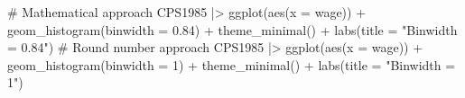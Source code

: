 \documentclass[
  letterpaper,
]{book}
\newenvironment{Shaded}{\begin{snugshade}}{\end{snugshade}}
\newcommand{\AttributeTok}[1]{\textcolor[rgb]{0.40,0.45,0.13}{#1}}
\newcommand{\CommentTok}[1]{\textcolor[rgb]{0.37,0.37,0.37}{#1}}
\newcommand{\DecValTok}[1]{\textcolor[rgb]{0.68,0.00,0.00}{#1}}
\newcommand{\FloatTok}[1]{\textcolor[rgb]{0.68,0.00,0.00}{#1}}
\newcommand{\FunctionTok}[1]{\textcolor[rgb]{0.28,0.35,0.67}{#1}}
\newcommand{\NormalTok}[1]{\textcolor[rgb]{0.00,0.23,0.31}{#1}}
\newcommand{\SpecialCharTok}[1]{\textcolor[rgb]{0.37,0.37,0.37}{#1}}
\newcommand{\StringTok}[1]{\textcolor[rgb]{0.13,0.47,0.30}{#1}}
\begin{document}
\begin{Shaded}
\begin{Highlighting}[]
\CommentTok{\# Mathematical approach}
\NormalTok{CPS1985 }\SpecialCharTok{|\textgreater{}} \FunctionTok{ggplot}\NormalTok{(}\FunctionTok{aes}\NormalTok{(}\AttributeTok{x =}\NormalTok{ wage)) }\SpecialCharTok{+}
    \FunctionTok{geom\_histogram}\NormalTok{(}\AttributeTok{binwidth =} \FloatTok{0.84}\NormalTok{) }\SpecialCharTok{+}
    \FunctionTok{theme\_minimal}\NormalTok{() }\SpecialCharTok{+}
    \FunctionTok{labs}\NormalTok{(}\AttributeTok{title =} \StringTok{"Binwidth = 0.84"}\NormalTok{)}
\CommentTok{\# Round number approach  }
\NormalTok{CPS1985 }\SpecialCharTok{|\textgreater{}} \FunctionTok{ggplot}\NormalTok{(}\FunctionTok{aes}\NormalTok{(}\AttributeTok{x =}\NormalTok{ wage)) }\SpecialCharTok{+}
    \FunctionTok{geom\_histogram}\NormalTok{(}\AttributeTok{binwidth =} \DecValTok{1}\NormalTok{) }\SpecialCharTok{+}
    \FunctionTok{theme\_minimal}\NormalTok{() }\SpecialCharTok{+}
    \FunctionTok{labs}\NormalTok{(}\AttributeTok{title =} \StringTok{"Binwidth = 1"}\NormalTok{)}
\end{Highlighting}
\end{Shaded}
\end{document}
